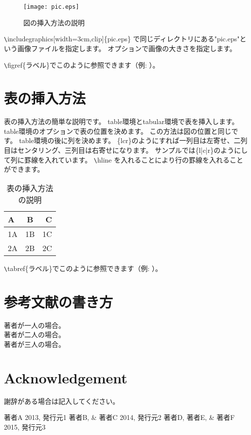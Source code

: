 \documentclass[a4paper,10pt,oneside,twocolumn,notitlepage,final]{jarticle}
\begin{document}
\begin{figure}[htbp]
 \centering
 \texttt{[image: pic.eps]}
 \caption{図の挿入方法の説明}
 \label{pic} %
\end{figure}

\verb+\+includegraphics[width=3cm,clip]\{pic.eps\}
で同じディレクトリにある"pic.eps"という画像ファイルを指定します。
オプションで画像の大きさを指定します。

\verb+\+figref\{ラベル\}でこのように参照できます（例: ）。

\section{表の挿入方法}
表の挿入方法の簡単な説明です。
table環境とtabular環境で表を挿入します。
table環境のオプションで表の位置を決めます。
この方法は図の位置と同じです。
table環境の後に列を決めます。
\{lcr\}のようにすれば一列目は左寄せ、二列目はセンタリング、三列目は右寄せになります。
サンプルでは\{l|c|r\}のようにして列に罫線を入れています。
\verb+\+hline を入れることにより行の罫線を入れることができます。

\begin{table}[htb]
 \caption{表の挿入方法の説明}
  \centering
   \begin{tabular}{|l|c|r|} \hline
     A & B & C  \\ \hline
     1A & 1B & 1C  \\
     2A & 2B & 2C  \\ \hline
   \end{tabular}
  \label{table}%
\end{table}

\verb+\+tabref\{ラベル\}でこのように参照できます（例: ）。

\section{参考文献の書き方}
\noindent
著者が一人の場合\citep{ラベル1}。\\
著者が二人の場合\citep{ラベル2}。\\
著者が三人の場合\citep{ラベル3}。\\
\section*{Acknowledgement}
謝辞がある場合は記入してください。

\small
\begin{thebibliography}{99}
 著者A 2013, 発行元1
 著者B, \& 著者C 2014,  発行元2
 著者D, 著者E, \& 著者F 2015, 発行元3
 
 
\end{thebibliography}
\end{document}
